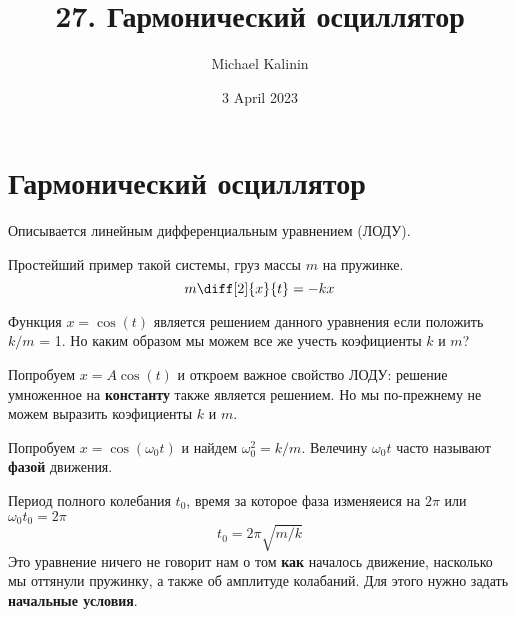 \documentclass[12pt]{article}
\author{Michael Kalinin}
\date{3 April 2023}
\title{27. Гармонический осциллятор}
\begin{document}
\maketitle

\section{Гармонический осциллятор}

Описывается линейным дифференциальным уравнением (ЛОДУ).

Простейший пример такой системы, груз массы $m$ на пружинке.
\[
m\diff[2]{x}{t}=-kx
\]

Функция $x=\cos(t)$ является решением данного уравнения если положить $k/m$ = 1.
Но каким образом мы можем все же учесть коэфициенты $k$ и $m$?

Попробуем $x=A\cos(t)$ и откроем важное свойство ЛОДУ: решение умноженное на \textbf{константу} также является решением. Но мы по-прежнему не можем выразить коэфициенты $k$ и $m$.

Попробуем $x=\cos(\omega_0 t)$ и найдем $\omega_0^2=k/m$. Велечину $\omega_0 t$ часто называют \textbf{фазой} движения.

Период полного колебания $t_0$, время за которое фаза изменяеися на $2\pi$ или $\omega_0t_0=2\pi$
\[
t_0=2\pi\sqrt{m/k}
\]
Это уравнение ничего не говорит нам о том \textbf{как} началось движение, насколько мы оттянули пружинку, а также об амплитуде колабаний. Для этого нужно задать \textbf{начальные условия}.
\end{document}
